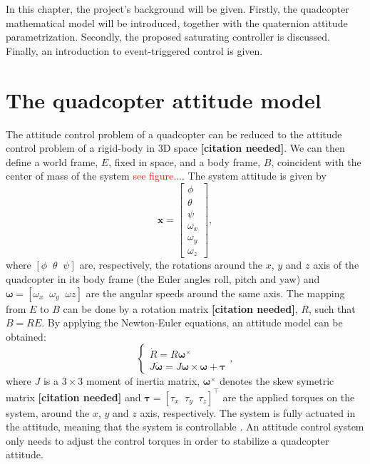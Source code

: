 In this chapter, the project's background will be given. Firstly, the quadcopter mathematical model will be introduced, together with the quaternion attitude parametrization. Secondly, the proposed saturating controller is discussed. Finally, an introduction to event-triggered control is given.

\section{The quadcopter attitude model}
	
	The attitude control problem of a quadcopter can be reduced to the attitude control problem of a rigid-body in $3$D space \textbf{[citation needed]}. We can then define a world frame, $E$, fixed in space, and a body frame, $B$, coincident with the center of mass of the system \textcolor{red}{see figure...}. The system attitude is given by
	\[
		\mathbf{x} = \begin{bmatrix}
				\phi\\
				\theta\\
				\psi\\
				\omega_{x}\\
				\omega_{y}\\
				\omega_{z}
			     \end{bmatrix},
	\]
	where $\left [\phi\;\;\theta\;\;\psi \right]$ are, respectively, the rotations around the $x$, $y$ and $z$ axis of the quadcopter in its body frame (the Euler angles roll, pitch and yaw) and $\boldsymbol \omega = \left [\omega_{x}\;\;\omega_{y}\;\;\omega{z} \right]$ are the angular speeds around the same axis. The mapping from $E$ to $B$ can be done by a rotation matrix \textbf{[citation needed]}, $R$, such that $B = R E$. By applying the Newton-Euler equations, an attitude model can be obtained:
	\begin{equation}
		\left \{ \begin{array}{l}
				\dot R = R \boldsymbol \omega^\times\\
				J \boldsymbol{ \dot \omega }= J \boldsymbol \omega \times \boldsymbol \omega + \boldsymbol \tau
			\end{array} \right . ,
		\label{attitude_dynamics_eq}
	\end{equation}
	where $J$ is a $3\times3$ moment of inertia matrix, $\boldsymbol \omega^\times$ denotes the skew symetric matrix \textbf{[citation needed]} and $\boldsymbol \tau = \left [\tau_x\;\;\tau_y\;\;\tau_z\right]^\top$ are the applied torques on the system, around the $x$, $y$ and $z$ axis, respectively. The system is fully actuated in the attitude, meaning that the system is controllable \cite{rigid_attitude_control}. An attitude control system only needs to adjust the control torques in order to stabilize a quadcopter attitude.
	
